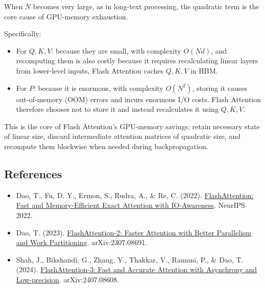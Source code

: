 When \(N\) becomes very large, as in long-text processing, the quadratic term is the core cause of GPU-memory exhaustion.

Specifically:

\begin{itemize}
\tightlist
\item
  For \(Q,K,V\): because they are small, with complexity \(O(Nd)\), and recomputing them is also costly because it requires recalculating linear layers from lower-level inputs, Flash Attention caches \(Q,K,V\) in HBM.
\item
  For \(P\): because it is enormous, with complexity \(O(N^2)\), storing it causes out-of-memory (OOM) errors and incurs enormous I/O costs. Flash Attention therefore chooses not to store it and instead recalculates it using \(Q,K,V\).
\end{itemize}

This is the core of Flash Attention's GPU-memory savings: retain necessary state of linear size, discard intermediate attention matrices of quadratic size, and recompute them blockwise when needed during backpropagation.

\FloatBarrier
{}
\hypertarget{references-92}{%
\subsection{References}\label{references-92}}

\vspace{0.25em}
\begin{itemize}
\tightlist
\item
  Dao, T., Fu, D. Y., Ermon, S., Rudra, A., \& Re, C. (2022). \href{https://arxiv.org/abs/2205.14135}{FlashAttention: Fast and Memory-Efficient Exact Attention with IO-Awareness}. NeurIPS 2022.
\item
  Dao, T. (2023). \href{https://arxiv.org/abs/2307.08691}{FlashAttention-2: Faster Attention with Better Parallelism and Work Partitioning}. arXiv:2307.08691.
\item
  Shah, J., Bikshandi, G., Zhang, Y., Thakkar, V., Ramani, P., \& Dao, T. (2024). \href{https://arxiv.org/abs/2407.08608}{FlashAttention-3: Fast and Accurate Attention with Asynchrony and Low-precision}. arXiv:2407.08608.
\end{itemize}

\clearpage
